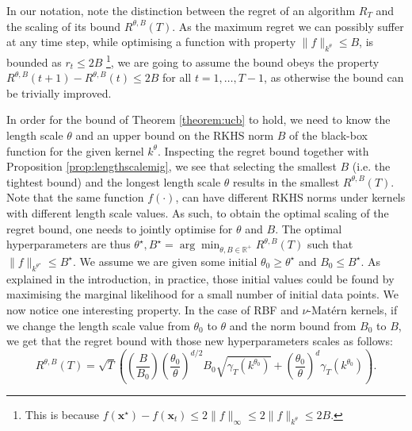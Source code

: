 \documentclass{article}
\theoremstyle{plain}
\theoremstyle{definition}
\theoremstyle{remark}
\theoremstyle{plain}
\begin{document}
 In our notation, note the distinction between the regret of an algorithm $R_T$ and the scaling of its bound $R^{\theta, B}(T)$. As the maximum regret we can possibly suffer at any time step, while optimising a function with property $\lVert f \rVert_{k^{\theta}} \le B$,  is bounded as $r_t \le 2B$ \footnote{This is because $f(\bm{x}^\star) - f(\bm{x}_t) \le 2\lVert f \rVert_{\infty} \le 2\lVert f \rVert_{k^\theta} \le 2B$.}, we are going to assume the bound obeys the property $R^{\theta, B}(t + 1) - R^{\theta, B}(t) \le 2B$ for all $t=1,\dots,T-1$, as otherwise the bound can be trivially improved. 
 
 In order for the bound of Theorem \ref{theorem:ucb} to hold, we need to know the length scale $\theta$ and an upper bound on the RKHS norm $B$ of the black-box function for the given kernel $k^\theta$. Inspecting the regret bound together with Proposition \ref{prop:lengthscalemig}, we see that selecting the smallest $B$ (i.e. the tightest bound) and the longest length scale $\theta$ results in the smallest $R^{\theta, B}(T)$. Note that the same function $f(\cdot)$, can have different RKHS norms under kernels with different length scale values. As such, to obtain the optimal scaling of the regret bound, one needs to jointly optimise for $\theta$ and $B$. The optimal hyperparameters are thus $\theta^\star, B^\star = \arg\min_{\theta, B \in \mathbb{R}^+} R^{\theta, B}(T)$ such that $\lVert f \rVert_{k^{\theta^\star}} \le B^\star$. We assume we are given some initial $\theta_0 \ge \theta^\star$ and $B_0 \le B^\star$.  As explained in the introduction, in practice, those initial values could be found by maximising the marginal likelihood for a small number of initial data points.  We now notice one interesting property. In the case of RBF and  $\nu$-Matérn kernels, if we change the length scale value from $\theta_0$ to $\theta$ and the norm bound from $B_0$ to $B$, we  get that the regret bound with those new hyperparameters scales as follows:
\begin{equation*}
    R^{\theta,  B}(T) =  \sqrt{T}  \left(\left(\frac{B}{B_0} \right)\left(\frac{\theta_0}{\theta} \right)^{d/2}  B_0\sqrt{\gamma_T(k^{\theta_0})} + \left(\frac{\theta_0}{\theta} \right)^{d}\gamma_T(k^{\theta_0}) \right) .
\end{equation*}
\end{document}
